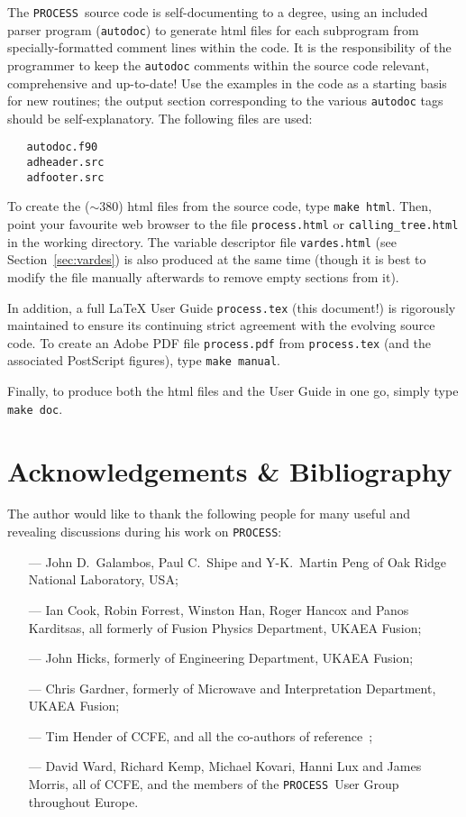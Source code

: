\documentclass[11pt,a4paper]{report}
\newcommand{\process}{\mbox{\texttt{PROCESS}}}
\newcommand{\setheader}[1]
 {\markright{\rlap{\lower0.8ex\hbox to\textwidth{\hrulefill}}{\bf#1}}}
\newcommand{\mychapter}[1]{\small\normalsize
 \setcounter{footnote}{0}
 \chapter{#1}
 \pagestyle{myheadings}
 \setheader{Chapter \thechapter\hspace{0.8em}#1}}
\begin{document}
The \process\ source code is self-documenting to a degree, using an included
parser program (\texttt{autodoc}) to generate html files for each subprogram
from specially-formatted comment lines within the code. It is the
responsibility of the programmer to keep the \texttt{autodoc} comments within
the source code relevant, comprehensive and up-to-date! Use the examples in
the code as a starting basis for new routines; the output section
corresponding to the various \texttt{autodoc} tags should be
self-explanatory. The following files are used:
\begin{verbatim}
   autodoc.f90
   adheader.src
   adfooter.src
\end{verbatim}
To create the ($\sim 380$) html files from the source code, type
\verb+make html+.  Then, point your favourite web browser to the file
\texttt{process.html} or \texttt{calling\_tree.html} in the working
directory. The variable descriptor file \texttt{vardes.html} (see
Section~\ref{sec:vardes}) is also produced at the same time (though it is best
to modify the file manually afterwards to remove empty sections from it).

In addition, a full \LaTeX\/ User Guide \texttt{process.tex} (this document!) is
rigorously maintained to ensure its continuing strict agreement with the
evolving source code. To create an Adobe PDF file \texttt{process.pdf} from
\texttt{process.tex} (and the associated PostScript figures),
type \verb+make manual+.

Finally, to produce both the html files and the User Guide in one go, simply
type \verb+make doc+.


\mychapter{Acknowledgements \& Bibliography}
\label{chap:acks}

The author would like to thank the following people for many useful
and revealing discussions during his work on \process:

\begin{itemize}
\item[---]
John D.\ Galambos, Paul C.\ Shipe and Y-K.\ Martin Peng of Oak Ridge
National Laboratory, USA;
\item[---]
Ian Cook, Robin Forrest, Winston Han, Roger Hancox and Panos Karditsas, all formerly of
Fusion Physics Department, UKAEA Fusion;
\item[---]
John Hicks, formerly of Engineering Department, UKAEA Fusion;
\item[---]
Chris Gardner, formerly of Microwave and Interpretation Department, UKAEA
Fusion;
\item[---]
Tim Hender of CCFE, and all the co-authors of reference~\cite{172};
\item[---]
David Ward, Richard Kemp, Michael Kovari, Hanni Lux and James Morris, all of
CCFE, and the members of the \process\ User Group throughout Europe.
\end{itemize}
\end{document}
